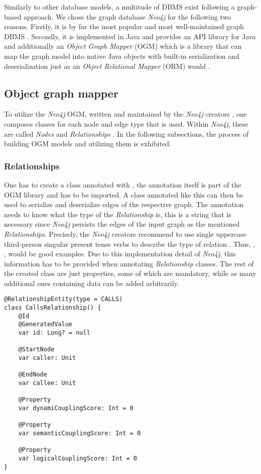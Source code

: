 \documentclass[12pt,a4paper]{report}
\begin{document}
Similarly to other database models, a multitude of DBMS exist following a
graph-based approach.
We chose the graph database \textit{Neo4j} for the following two reasons.
Firstly, it is by far the most popular and most well-maintained graph DBMS
\cite{graph-dbms-ranking}.
Secondly, it is implemented in Java and provides an API library for Java
and additionally an \textit{Object Graph Mapper} (OGM) which is a library
that can map the graph model into native Java objects with built-in
serialization and deserialization just as an \textit{Object Relational Mapper} (ORM)
would \cite{neo4j-ogm}.


\subsection{Object graph mapper}

To utilize the \textit{Neo4j} OGM, written and maintained by the \textit{Neo4j}
creators \cite{neo4j-ogm}, one composes classes for each node and edge type
that is used. Within \textit{Neo4j}, these are called \textit{Nodes} and
\textit{Relationships} \cite{neo4j-ogm}.
In the following subsections, the process of building OGM models and utilizing
them is exhibited.


\subsubsection{Relationships}
One has to create a class annotated with ,
the annotation itself is part of the OGM library and has to be imported.
A class annotated like this can then be used to serialize and deserialize edges
of the respective graph. The annotation needs to know what the type of the
\textit{Relationship} is, this is a string that is necessary since \textit{Neo4j}
persists the edges of the input graph as the mentioned \textit{Relationships}.
Precisely, the \textit{Neo4j} creators recommend to use single uppercase third-person
singular present tense verbs to describe the type of relation \cite{neo4j-ogm}.
Thus, , ,  would
be good examples. Due to this implementation detail of \textit{Neo4j},
this information has to be provided when annotating \textit{Relationship} classes.
The rest of the created class are just properties, some of which are mandatory,
while as many additional ones containing data can be added arbitrarily.

\smaller
\begin{lstlisting}[caption=Relationship OGM class, label=ogm-relationship, breaklines=true]
@RelationshipEntity(type = CALLS)
class CallsRelationship() {
    @Id
    @GeneratedValue
    var id: Long? = null

    @StartNode
    var caller: Unit

    @EndNode
    var callee: Unit

    @Property
    var dynamiCouplingScore: Int = 0

    @Property
    var semanticCouplingScore: Int = 0

    @Property
    var logicalCouplingScore: Int = 0
}
\end{lstlisting}
\normalsize
\end{document}
